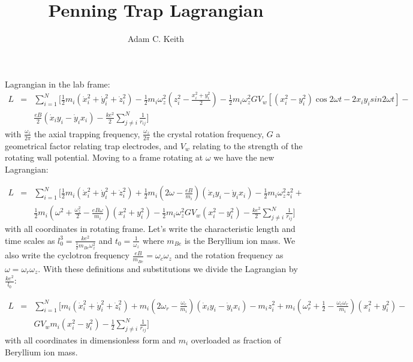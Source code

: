 \documentclass[12pt]{article}
\begin{document}
\title{Penning Trap Lagrangian}
\author{Adam C. Keith}
\maketitle

Lagrangian in the lab frame:
\begin{eqnarray}
L &=& \sum^N_{i=1} \Bigg[\frac{1}{2} m_i \left(\dot{x}_i^2 + \dot{y}_i^2 + \dot{z}_i^2 \right) - \frac{1}{2} m_i \omega_z^2 \left(z_i^2 - \frac{x_i^2 + y_i^2}{2} \right) - \frac{1}{2}  m_i \omega_z^2  G V_w  \left[\left(x_i^2 - y_i^2 \right)\cos{2\omega t} - 2 x_i y_i sin{2\omega t}\right] - \nonumber \\
&&  \frac{eB}{2} \left(\dot{x}_i y_i - \dot{y}_i x_i \right) - \frac{ke^2}{2} \sum^N_{j \neq i}\frac{1}{r_{ij}} \Bigg]
\end{eqnarray}
with $\frac{\omega_z}{2\pi}$ the axial trapping frequency, $\frac{\omega_z}{2\pi}$ the crystal rotation frequency, $G$ a geometrical factor relating trap electrodes, and $V_w$ relating to the strength of the rotating wall potential. Moving to a frame rotating at $\omega$ we have the new Lagrangian:

\begin{eqnarray}
L &=& \sum^N_{i=1} \Bigg[\frac{1}{2} m_i \left(\dot{x}_i^2 + \dot{y}_i^2 + \dot{z}_i^2 \right) +  \frac{1}{2} m_i \left(2\omega - \frac{eB}{m_i}\right) \left(\dot{x}_i y_i - \dot{y}_i x_i \right) - \frac{1}{2}m_i\omega_z^2 z_i^2 +
 \nonumber \\
&&  \frac{1}{2} m_i \left(\omega^2 + \frac{\omega_z^2}{2} - \frac{eB\omega}{m_i} \right) \left(x_i^2+y_i^2\right) - \frac{1}{2}  m_i \omega_z^2  G V_w  \left(x_i^2 - y_i^2 \right) - \frac{ke^2}{2} \sum^N_{j \neq i}\frac{1}{r_{ij}} \Bigg]
\end{eqnarray}
with all coordinates in rotating frame. Let's write the characteristic length and time scales as $l_0^3 = \frac{ke^2}{\frac{1}{2}m_{Be} \omega_z^2}$ and $t_0 = \frac{1}{\omega_z}$ where $m_{Be}$ is the Beryllium ion mass. We also write the cyclotron frequency $\frac{eB}{m_{Be}} = \omega_c \omega_z$ and the rotation frequency as $\omega = \omega_r \omega_z$. With these definitions and substitutions we divide the Lagrangian by $\frac{ke^2}{l_0}$:

\begin{eqnarray}
L &=& \sum^N_{i=1} \Bigg[m_i \left(\dot{x}_i^2 + \dot{y}_i^2 + \dot{z}_i^2 \right) +  m_i \left(2\omega_r - \frac{\omega_c}{m_i} \right) \left(\dot{x}_i y_i - \dot{y}_i x_i \right) - m_i z_i^2 + m_i \left(\omega_r^2  + \frac{1}{2} - \frac{\omega_c \omega_r}{m_i} \right) \left(x_i^2+y_i^2\right) - \nonumber \\
&&  G V_w m_i \left(x_i^2 - y_i^2 \right) - \frac{1}{2} \sum^N_{j \neq i}\frac{1}{r_{ij}} \Bigg]
\end{eqnarray}
with all coordinates in dimensionless form and $m_i$ overloaded as fraction of Beryllium ion mass.
\end{document}
